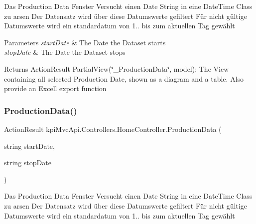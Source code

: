 Das Production Data Fenster Versucht einen Date String in eine Date\+Time Class zu arsen Der Datensatz wird über diese Datumswerte gefiltert Für nicht gültige Datumswerte wird ein standardatum von 1.. bis zum aktuellen Tag gewählt 


\begin{DoxyParams}{Parameters}
{\em start\+Date} & The Date the Dataset starts\\
\hline
{\em stop\+Date} & The Date the Dataset stops \\
\hline
\end{DoxyParams}
\begin{DoxyReturn}{Returns}
{\ttfamily Action\+Result Partial\+View(\char`\"{}\+\_\+\+Production\+Data\char`\"{}, model);} The View containing all selected Production Date, shown as a diagram and a table. Also provide an Excell export function 
\end{DoxyReturn}
\mbox{\label{classkpi_mvc_api_1_1_controllers_1_1_home_controller_ae5c2fcc4413eda2cab2775cd9819efca}} 
\subsubsection{\texorpdfstring{Production\+Data()}{ProductionData()}\hspace{0.1cm}{\footnotesize\ttfamily [2/2]}}
{\footnotesize\ttfamily Action\+Result kpi\+Mvc\+Api.\+Controllers.\+Home\+Controller.\+Production\+Data (\begin{DoxyParamCaption}\item[{string}]{start\+Date,  }\item[{string}]{stop\+Date }\end{DoxyParamCaption})\hspace{0.3cm}{\ttfamily [inline]}}



Das Production Data Fenster Versucht einen Date String in eine Date\+Time Class zu arsen Der Datensatz wird über diese Datumswerte gefiltert Für nicht gültige Datumswerte wird ein standardatum von 1.. bis zum aktuellen Tag gewählt 


